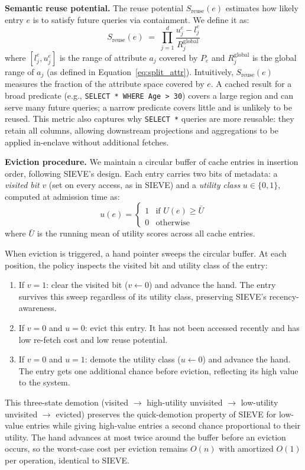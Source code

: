 \textbf{Semantic reuse potential.}
The reuse potential $S_{\text{reuse}}(e)$ estimates how likely entry $e$ is to satisfy future queries via containment.
We define it as:
\begin{equation}
    S_{\text{reuse}}(e) \;=\; \prod_{j=1}^{d} \frac{u_j^e - l_j^e}{R_j^{\text{global}}}
    \label{eq:reuse}
\end{equation}
where $[l_j^e, u_j^e]$ is the range of attribute $a_j$ covered by $P_e$ and $R_j^{\text{global}}$ is the global range of $a_j$ (as defined in Equation~\ref{eq:split_attr}).
Intuitively, $S_{\text{reuse}}(e)$ measures the fraction of the attribute space covered by $e$.
A cached result for a broad predicate (e.g., \texttt{SELECT * WHERE Age > 30}) covers a large region and can serve many future queries; a narrow predicate covers little and is unlikely to be reused.
This metric also captures why \texttt{SELECT *} queries are more reusable: they retain all columns, allowing downstream projections and aggregations to be applied in-enclave without additional fetches.

\textbf{Eviction procedure.}
We maintain a circular buffer of cache entries in insertion order, following SIEVE's design.
Each entry carries two bits of metadata: a \emph{visited bit} $v$ (set on every access, as in SIEVE) and a \emph{utility class} $u \in \{0, 1\}$, computed at admission time as:
\begin{equation}
    u(e) =
    \begin{cases}
        1 & \text{if } U(e) \geq \bar{U} \\
        0 & \text{otherwise}
    \end{cases}
    \label{eq:utility_class}
\end{equation}
where $\bar{U}$ is the running mean of utility scores across all cache entries.

When eviction is triggered, a hand pointer sweeps the circular buffer.
At each position, the policy inspects the visited bit and utility class of the entry:
\begin{enumerate}
    \item If $v = 1$: clear the visited bit ($v \gets 0$) and advance the hand.  The entry survives this sweep regardless of its utility class, preserving SIEVE's recency-awareness.
    \item If $v = 0$ and $u = 0$: evict this entry.  It has not been accessed recently and has low re-fetch cost and low reuse potential.
    \item If $v = 0$ and $u = 1$: demote the utility class ($u \gets 0$) and advance the hand.  The entry gets one additional chance before eviction, reflecting its high value to the system.
\end{enumerate}
This three-state demotion (visited $\to$ high-utility unvisited $\to$ low-utility unvisited $\to$ evicted) preserves the quick-demotion property of SIEVE for low-value entries while giving high-value entries a second chance proportional to their utility.
The hand advances at most twice around the buffer before an eviction occurs, so the worst-case cost per eviction remains $O(n)$ with amortized $O(1)$ per operation, identical to SIEVE.

